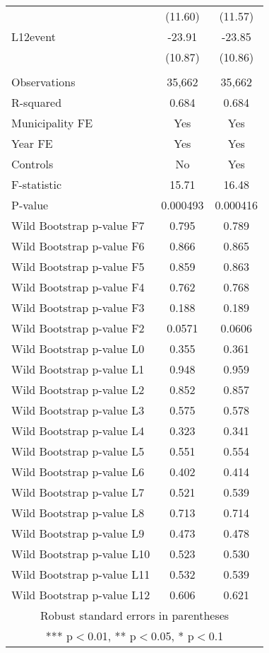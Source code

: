 \documentclass[]{article}
\begin{document}
\begin{tabular}{lcc}
 & (11.60) & (11.57) \\
L12event & -23.91 & -23.85 \\
 & (10.87) & (10.86) \\
 &  &  \\
Observations & 35,662 & 35,662 \\
R-squared & 0.684 & 0.684 \\
Municipality FE & Yes & Yes \\
Year FE & Yes & Yes \\
Controls & No & Yes \\
F-statistic & 15.71 & 16.48 \\
P-value & 0.000493 & 0.000416 \\
Wild Bootstrap p-value F7 & 0.795 & 0.789 \\
Wild Bootstrap p-value F6 & 0.866 & 0.865 \\
Wild Bootstrap p-value F5 & 0.859 & 0.863 \\
Wild Bootstrap p-value F4 & 0.762 & 0.768 \\
Wild Bootstrap p-value F3 & 0.188 & 0.189 \\
Wild Bootstrap p-value F2 & 0.0571 & 0.0606 \\
Wild Bootstrap p-value L0 & 0.355 & 0.361 \\
Wild Bootstrap p-value L1 & 0.948 & 0.959 \\
Wild Bootstrap p-value L2 & 0.852 & 0.857 \\
Wild Bootstrap p-value L3 & 0.575 & 0.578 \\
Wild Bootstrap p-value L4 & 0.323 & 0.341 \\
Wild Bootstrap p-value L5 & 0.551 & 0.554 \\
Wild Bootstrap p-value L6 & 0.402 & 0.414 \\
Wild Bootstrap p-value L7 & 0.521 & 0.539 \\
Wild Bootstrap p-value L8 & 0.713 & 0.714 \\
Wild Bootstrap p-value L9 & 0.473 & 0.478 \\
Wild Bootstrap p-value L10 & 0.523 & 0.530 \\
Wild Bootstrap p-value L11 & 0.532 & 0.539 \\
 Wild Bootstrap p-value L12 & 0.606 & 0.621 \\ \hline
\multicolumn{3}{c}{ Robust standard errors in parentheses} \\
\multicolumn{3}{c}{ *** p$<$0.01, ** p$<$0.05, * p$<$0.1} \\
\end{tabular}
\end{document}
